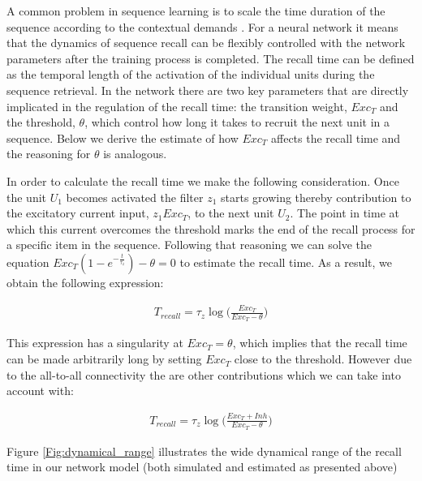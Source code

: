 \documentclass{esannV2}
\begin{document}
A common problem in sequence learning is to scale the time duration of the sequence according to the contextual demands \cite{murray2017learning}. For a neural network it means that the dynamics of sequence recall can be flexibly controlled with the network parameters after the training process is completed. The recall time can be defined as the temporal length of the activation of the individual units during the sequence retrieval. In the network there are two key parameters that are directly implicated in the regulation of the recall time: the transition weight, $Exc_T$ and the threshold, $\theta$, which control how long it takes to recruit the next unit in a sequence. Below we derive the estimate of how $Exc_T$ affects the recall time and the reasoning for $\theta$ is analogous. 



In order to calculate the recall time we make the following consideration. Once the unit $U_1$ becomes activated the filter $z_1$ starts growing thereby contribution to the excitatory current input, $z_1 Exc_T$, to the next unit $U_2$. The point in time at which this current overcomes the threshold marks the end of the recall process for a specific item in the sequence. Following that reasoning we can solve the equation $Exc_{T}(1 - e^{-\frac{t}{\tau_z}}) - \theta = 0$ to estimate the recall time. As a result, we obtain the following expression:

\begin{align}
T_{recall} = \tau_z \log\Big(\frac{Exc_T}{Exc_T - \theta} \Big)
\end{align}

This expression has a singularity at $Exc_T = \theta$, which implies that the recall time can be made arbitrarily long by setting $Exc_T$ close to the threshold. However due to the all-to-all connectivity the are other contributions which we can take into account with:

\begin{align}
T_{recall} = \tau_z \log\Big(\frac{Exc_T + Inh}{Exc_T - \theta}\Big) \label{eq:recall_complex}
\end{align}

Figure \ref{Fig:dynamical_range} illustrates the wide dynamical range of the recall time in our network model (both simulated and estimated as presented above)
\end{document}
